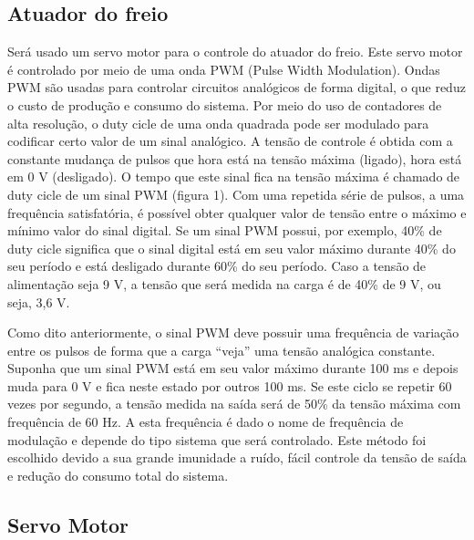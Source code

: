 
\subsection{Atuador do freio} %
\label{sub:atuador}

Será usado um servo motor para o controle do atuador do freio. Este servo motor é controlado por meio de uma onda PWM (Pulse Width Modulation). Ondas PWM são usadas para controlar circuitos analógicos de forma digital, o que reduz o custo de produção e consumo do sistema. Por meio do uso de contadores de alta resolução, o duty cicle de uma onda quadrada pode ser modulado para codificar certo valor de um sinal analógico. A tensão de controle é obtida com a constante mudança de pulsos que hora está na tensão máxima (ligado), hora está em 0 V (desligado). O tempo que este sinal fica na tensão máxima é chamado de duty cicle de um sinal PWM (figura 1). Com uma repetida série de pulsos, a uma frequência satisfatória, é possível obter qualquer valor de tensão entre o máximo e mínimo valor do sinal digital.
Se um sinal PWM possui, por exemplo, 40\% de duty cicle significa que o sinal digital está em seu valor máximo durante 40\% do seu período e está desligado durante 60\% do seu período. Caso a tensão de alimentação seja 9 V, a tensão que será medida na carga é de 40\% de 9 V, ou seja, 3,6 V.

Como dito anteriormente, o sinal PWM deve possuir uma frequência de variação entre os pulsos de forma que a carga “veja” uma tensão analógica constante. Suponha que um sinal PWM está em seu valor máximo durante 100 ms e depois muda para 0 V e fica neste estado por outros 100 ms. Se este ciclo se repetir 60 vezes por segundo, a tensão medida na saída será de 50\% da tensão máxima com frequência de 60 Hz. A esta frequência é dado o nome de frequência de modulação e depende do tipo sistema que será controlado.
Este método foi escolhido devido a sua grande imunidade a ruído, fácil controle da tensão de saída e redução do consumo total do sistema.

\subsection{Servo Motor} %
\label{sub:servo_motor}
